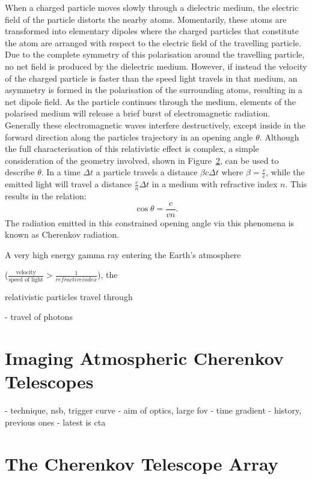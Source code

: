 When a charged particle moves slowly through a dielectric medium, the electric field of the particle distorts the nearby atoms. Momentarily, these atoms are transformed into elementary dipoles where the charged particles that constitute the atom are arranged with respect to the electric field of the travelling particle. Due to the complete symmetry of this polarisation around the travelling particle, no net field is produced by the dielectric medium. However, if instead the velocity of the charged particle is faster than the speed light travels in that medium, an asymmetry is formed in the polarisation of the surrounding atoms, resulting in a net dipole field. As the particle continues through the medium, elements of the polarised medium will release a brief burst of electromagnetic radiation. Generally these electromagnetic waves interfere destructively, except inside in the forward direction along the particles trajectory in an opening angle $\theta$. Although the full characterisation of this relativistic effect is complex, a simple consideration of the geometry involved, shown in Figure~\ref{}, can be used to describe $\theta$. In a time $\Delta t$ a particle travels a distance $\beta c \Delta t$ where $\beta = \frac{v}{c}$, while the emitted light will travel a distance $\frac{c}{n} \Delta t$ in a medium with refractive index $n$. This results in the relation:
\begin{equation} \label{eq:cherenkov_angle}
\cos \theta = \frac{c}{vn}.
\end{equation}
The radiation emitted in this constrained opening angle via this phenomena is known as Cherenkov radiation.

A very high energy gamma ray entering the Earth's atmosphere 




($\frac{\text{velocity}}{\text{speed of light}} > \frac{1}{refractive index}$), the  

relativistic particles travel through 




- travel of photons

\section{Imaging Atmospheric Cherenkov Telescopes}

- technique, nsb, trigger curve
- aim of optics, large fov
- time gradient
- history, previous ones
- latest is cta

\section{The Cherenkov Telescope Array}

